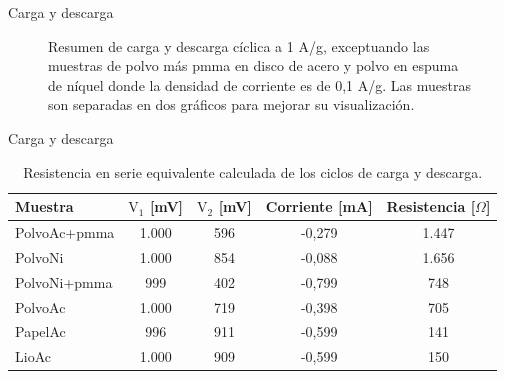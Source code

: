 \documentclass[aspectratio=169]{beamer}
\newcommand{\plotscale}{0.5}
\newcommand{\mPolvoAcero}{PolvoAc }
\newcommand{\mPolvoAceroPMMA}{PolvoAc+pmma }
\newcommand{\mPapelAcero}{PapelAc }
\newcommand{\mLiofilizadoAcero}{LioAc }
\newcommand{\mPolvoNiquel}{PolvoNi }
\newcommand{\mPolvoNiquelPMMA}{PolvoNi+pmma }
\begin{document}
\begin{frame}{Carga y descarga}
\begin{figure}[h!]
\begin{subfigure}{0.4\textwidth}
			\end{subfigure}
			\caption[Resumen de carga y descarga cíclica]{Resumen de carga y descarga cíclica a 1 A/g, exceptuando las muestras de polvo más pmma en disco de acero y polvo en espuma de níquel donde la densidad de corriente es de 0,1 A/g. Las muestras son separadas en dos gráficos para mejorar su visualización.}
			\label{fig:resumen_ccd}
		\end{figure}
	\end{frame}

	\begin{frame}{Carga y descarga}
		\begin{table}[h!]
			\centering
			\caption{Resistencia en serie equivalente calculada de los ciclos de carga y descarga.}
			\begin{tabular}{l c c c c}
				Muestra	&	$\mathrm{V_1}$ [mV]	&	$\mathrm{V_2}$ [mV]	&	Corriente [mA]	&	Resistencia [$\Omega$]	\\
				\hline
				\mPolvoAceroPMMA		&	1.000	&	596	&	-0,279	&	1.447	\\
				\mPolvoNiquel			&	1.000	&	854	&	-0,088	&	1.656	\\
				\mPolvoNiquelPMMA		&	999		&	402	&	-0,799	&	748		\\
				\mPolvoAcero			&	1.000	&	719	&	-0,398	&	705		\\
				\mPapelAcero			&	996		&	911	&	-0,599	&	141		\\
				\mLiofilizadoAcero		&	1.000	&	909	&	-0,599	&	150		\\
			\end{tabular}
			\label{tab:esr}
		\end{table}
	\end{frame}
\end{document}
